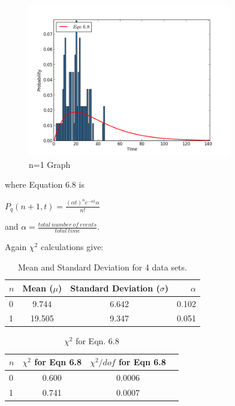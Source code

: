 \documentclass[aps,twocolumn,secnumarabic,nobalancelastpage,amsmath,amssymb,
nofootinbib]{revtex4}
\begin{document}
\begin{figure}[htbp]
\includegraphics[width=3.5in]{n1}
\caption{n=1 Graph}
\end{figure}

where Equation 6.8 is 

\begin{center}
$P_q(n+1,t)=\frac{{(\alpha{t})}^{n}{e}^{-\alpha{t}}\alpha}{n!}$
\end{center} and $\alpha=\frac{total\ number\ of\ events}{total\ time}$.

Again $\chi^2$ calculations give:

\begin{center}
\begin{table}[htbp]
\begin{tabular}{|l|c|c|r|}
\hline
{\small $n$} & {\small Mean ($\mu$)} & {\small Standard Deviation ($\sigma$)} & {\small $\alpha$} \\
\hline
0 	&  9.744  	& 6.642  & 0.102\\
1  	&  19.505   & 9.347  &  0.051\\

\hline
\end{tabular}
\caption{\label{tab:linfitresults} Mean and Standard Deviation for 4 data sets.}
\end{table}
\end{center}

\begin{center}
\begin{table}[htbp]
\begin{tabular}{|l|c|c|r|}
\hline
{\small $n$} & {\small $\chi^2$ for Eqn 6.8} & {\small $\chi^2/dof$ for Eqn 6.8}  \\
\hline
0	&  0.600  	& 0.0006  \\
1 	&  0.741   	& 0.0007  \\

\hline
\end{tabular}
\caption{\label{tab:linfitresults} $\chi^2$ for Eqn. 6.8}
\end{table}
\end{center}
\end{document}
